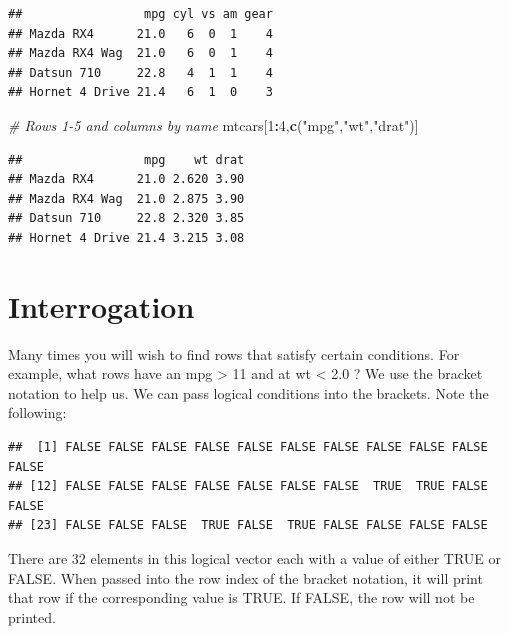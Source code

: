 \documentclass[]{book}
\newenvironment{Shaded}{\begin{snugshade}}{\end{snugshade}}
\newcommand{\KeywordTok}[1]{\textcolor[rgb]{0.13,0.29,0.53}{\textbf{#1}}}
\newcommand{\DecValTok}[1]{\textcolor[rgb]{0.00,0.00,0.81}{#1}}
\newcommand{\FloatTok}[1]{\textcolor[rgb]{0.00,0.00,0.81}{#1}}
\newcommand{\StringTok}[1]{\textcolor[rgb]{0.31,0.60,0.02}{#1}}
\newcommand{\CommentTok}[1]{\textcolor[rgb]{0.56,0.35,0.01}{\textit{#1}}}
\newcommand{\OperatorTok}[1]{\textcolor[rgb]{0.81,0.36,0.00}{\textbf{#1}}}
\newcommand{\NormalTok}[1]{#1}
\begin{document}
\begin{verbatim}
##                 mpg cyl vs am gear
## Mazda RX4      21.0   6  0  1    4
## Mazda RX4 Wag  21.0   6  0  1    4
## Datsun 710     22.8   4  1  1    4
## Hornet 4 Drive 21.4   6  1  0    3
\end{verbatim}

\begin{Shaded}
\begin{Highlighting}[]
\CommentTok{# Rows 1-5 and columns by name}
\NormalTok{mtcars[}\DecValTok{1}\OperatorTok{:}\DecValTok{4}\NormalTok{,}\KeywordTok{c}\NormalTok{(}\StringTok{"mpg"}\NormalTok{,}\StringTok{"wt"}\NormalTok{,}\StringTok{"drat"}\NormalTok{)]}
\end{Highlighting}
\end{Shaded}

\begin{verbatim}
##                 mpg    wt drat
## Mazda RX4      21.0 2.620 3.90
## Mazda RX4 Wag  21.0 2.875 3.90
## Datsun 710     22.8 2.320 3.85
## Hornet 4 Drive 21.4 3.215 3.08
\end{verbatim}

\section{Interrogation}\label{interrogation}

Many times you will wish to find rows that satisfy certain conditions.
For example, what rows have an mpg \textgreater{} 11 and at wt
\textless{} 2.0 ? We use the bracket notation to help us. We can pass
logical conditions into the brackets. Note the following:

\begin{Shaded}
\end{Shaded}

\begin{verbatim}
##  [1] FALSE FALSE FALSE FALSE FALSE FALSE FALSE FALSE FALSE FALSE FALSE
## [12] FALSE FALSE FALSE FALSE FALSE FALSE FALSE  TRUE  TRUE FALSE FALSE
## [23] FALSE FALSE FALSE  TRUE FALSE  TRUE FALSE FALSE FALSE FALSE
\end{verbatim}

There are 32 elements in this logical vector each with a value of either
TRUE or FALSE. When passed into the row index of the bracket notation,
it will print that row if the corresponding value is TRUE. If FALSE, the
row will not be printed.
\end{document}
